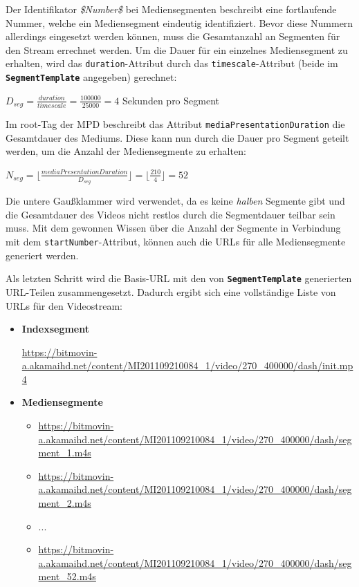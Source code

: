 \documentclass[paper = a4, fontsize = 12pt, parskip = half]{scrartcl} %
\def\attr#1{\texttt{#1}}
\def\elem#1{\texttt{\textbf{#1}}}
\begin{document}
Der Identifikator \textit{\$Number\$} bei Mediensegmenten beschreibt eine fortlaufende Nummer, welche ein Mediensegment eindeutig identifiziert. Bevor diese Nummern allerdings eingesetzt werden können, muss die Gesamtanzahl an Segmenten für den Stream errechnet werden. Um die Dauer für ein einzelnes Mediensegment zu erhalten, wird das \attr{duration}-Attribut durch das \attr{timescale}-Attribut (beide im \elem{SegmentTemplate} angegeben) gerechnet:

\begin{center}
	$D_{seg} = \frac{duration }{timescale} = \frac{100000}{25000}= 4$ Sekunden pro Segment
\end{center}

Im root-Tag der MPD beschreibt das Attribut \attr{mediaPresentationDuration} die Gesamtdauer des Mediums. Diese kann nun durch die Dauer pro Segment geteilt werden, um die Anzahl der Mediensegmente zu erhalten:

\begin{center}
	$N_{seg} = \lfloor \frac{mediaPresentationDuration}{D_{seg}} \rfloor = \lfloor \frac{210}{4} \rfloor = 52$
\end{center}

Die untere Gaußklammer wird verwendet, da es keine \textit{halben} Segmente gibt und die Gesamtdauer des Videos nicht restlos durch die Segmentdauer teilbar sein muss. Mit dem gewonnen Wissen über die Anzahl der Segmente in Verbindung mit dem \attr{startNumber}-Attribut, können auch die URLs für alle Mediensegmente generiert werden.

Als letzten Schritt wird die Basis-URL mit den von \elem{SegmentTemplate} generierten URL-Teilen zusammengesetzt. Dadurch ergibt sich eine vollständige Liste von URLs für den Videostream:

\begin{itemize}
	\item \textbf{Indexsegment}
	 
		\url{https://bitmovin-a.akamaihd.net/content/MI201109210084_1/video/270_400000/dash/init.mp4}

	\item \textbf{Mediensegmente}
	\begin{itemize}
		\item \url{https://bitmovin-a.akamaihd.net/content/MI201109210084_1/video/270_400000/dash/segment_1.m4s}
		\item \url{https://bitmovin-a.akamaihd.net/content/MI201109210084_1/video/270_400000/dash/segment_2.m4s}
		\item ... 
		\item \url{https://bitmovin-a.akamaihd.net/content/MI201109210084_1/video/270_400000/dash/segment_52.m4s}
	\end{itemize}
\end{itemize}
\end{document}
